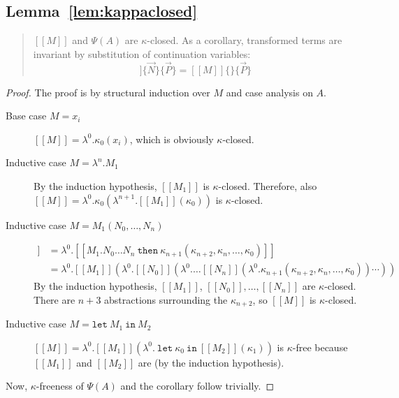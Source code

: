 \documentclass[a4paper,11pt,draft]{article}
\newcommand{\kw}[1]{\mathtt{#1}}
\begin{document}
\subsection{Lemma~\ref{lem:kappaclosed}}

\begin{quote}
  $[\![M]\!]$ and $\Psi(A)$ are $\kappa$-closed. As a corollary, transformed
  terms are invariant by substitution of continuation variables:
  \begin{equation*}
    [\![M]\!]\{\vec{N}\}\{\vec{P}\} = [\![M]\!]\{\}\{\vec{P}\}
  \end{equation*}
\end{quote}

\begin{proof}
The proof is by structural induction over $M$ and case analysis on $A$.

\begin{description}
\item[\sffamily Base case $M = x_{i}$]\hfill

  $[\![M]\!] = \lambda^{0}.\kappa_{0}(x_{i})$, which is obviously $\kappa$-closed.

\item[\sffamily Inductive case $M = \lambda^{n}.M_{1}$]\hfill

  By the induction hypothesis, $[\![M_{1}]\!]$ is $\kappa$-closed. Therefore, also
  $[\![M]\!] = \lambda^{0}.\kappa_{0}(\lambda^{n+1}.[\![M_{1}]\!](\kappa_{0}))$ is
  $\kappa$-closed.

\item[\sffamily Inductive case $M = M_{1}(N_{0}, \ldots, N_{n})$]\hfill
  \begin{align*}
    [\![M]\!] &= \lambda^{0}.[\![M_{1}.N_{0} \ldots N_{n} \: \kw{then} \: \kappa_{n+1}(\kappa_{n+2}, \kappa_{n}, \ldots, \kappa_{0})]\!] \\
              &= \lambda^{0}.[\![M_{1}]\!](\lambda^{0}.[\![N_{0}]\!](\lambda^{0}. \ldots [\![N_{n}]\!](\lambda^{0}.\kappa_{n+1}(\kappa_{n+2}, \kappa_{n}, \ldots, \kappa_{0})) \cdots ))
  \end{align*}
  By the induction hypothesis, $[\![M_{1}]\!]$, $[\![N_{0}]\!], \ldots, [\![N_{n}]\!]$ are $\kappa$-closed.
  There are $n+3$ abstractions surrounding the $\kappa_{n+2}$, so $[\![M]\!]$ is $\kappa$-closed.

\item[\sffamily Inductive case $M = \kw{let} \: M_{1} \: \kw{in} \: M_{2}$]\hfill

  $[\![M]\!] = \lambda^{0}.[\![M_{1}]\!](\lambda^{0}. \: \kw{let} \: \kappa_{0} \: \kw{in} \: [\![M_{2}]\!](\kappa_{1}))$
  is $\kappa$-free because $[\![M_{1}]\!]$ and $[\![M_{2}]\!]$ are (by the induction hypothesis).
\end{description}

Now, $\kappa$-freeness of $\Psi(A)$ and the corollary follow trivially.
\end{proof}
\end{document}
